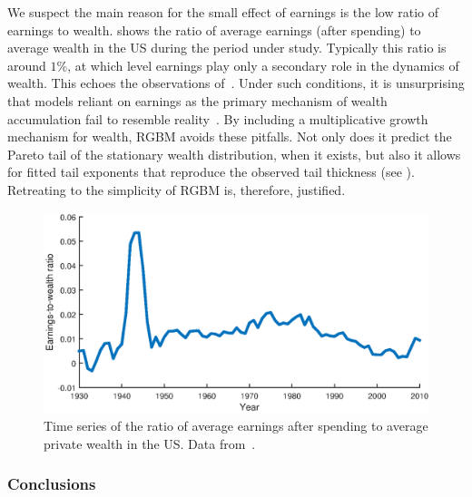 We suspect the main reason for the small effect of earnings is the low ratio of earnings to wealth.  shows the ratio of average earnings (after spending) to average wealth in the US during the period under study. Typically this ratio is around $1\%$, at which level earnings play only a secondary role in the dynamics of wealth. This echoes the observations of~\cite{Piketty2014,PikettyZucman2014,berman2017revisiting}. Under such conditions, it is unsurprising that models reliant on earnings as the primary mechanism of wealth accumulation fail to resemble reality~\cite{hubmer2016historical,benhabib2017earnings}. By including a multiplicative growth mechanism for wealth, RGBM avoids these pitfalls. Not only does it predict the Pareto tail of the stationary wealth distribution, when it exists, but also it allows for fitted tail exponents that reproduce the observed tail thickness (see ). Retreating to the simplicity of RGBM is, therefore, justified.

\begin{figure}[!htb]
\centering
\includegraphics[width=1.0\textwidth] {./chapter_3/figs/earnings_to_wealth.eps}
\caption{Time series of the ratio of average earnings after spending to average private wealth in the US. Data from~\cite{PikettyZucman2014}.}
\end{figure}

\subsubsection{Conclusions}\label{sec:conclusions}

